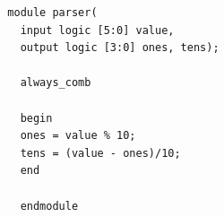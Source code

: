 \documentclass{article}
\begin{document}
\begin{lstlisting}
  module parser(
    input logic [5:0] value, 
    output logic [3:0] ones, tens);
    
    always_comb
    
    begin
    ones = value % 10;
    tens = (value - ones)/10;
    end
    
    endmodule
    
\end{lstlisting}
\end{document}
